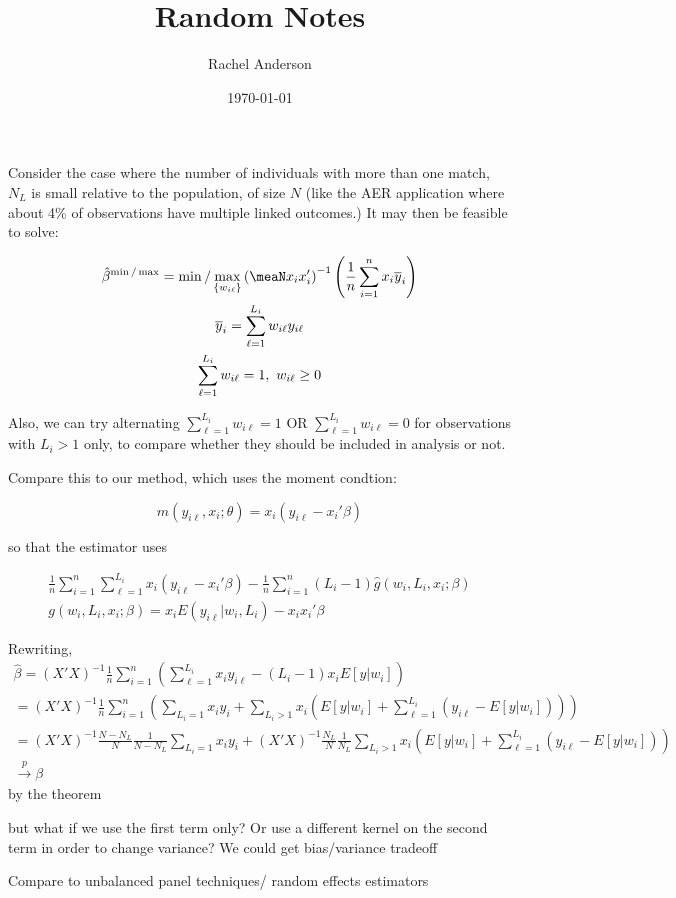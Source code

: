 \documentclass[11pt]{amsart}
\title{Random Notes}
\author{Rachel Anderson}
\date{\today}                                           %
\newcommand{\toP}{\overset{p}{\to}}
\newcommand{\meanN}{\frac{1}{n}\sum_{i=1}^n}
\newcommand{\sumL}{\sum_{\ell=1}^{L_i}}
\begin{document}
\maketitle

Consider the case where the number of individuals with more than one match, $N_{L}$ is small relative to the population, of size $N$ (like the AER application where about 4\% of observations have multiple linked outcomes.)  It may then be feasible to solve:

\begin{gather*}\hat{\beta}^{\min/\max} = \min/\max_{\{w_{i\ell}\}} \left(\meaN x_ix_i'\right)^{-1} \left(\meanN x_i \overline{y}_i \right) \\
\overline{y}_i = \sumL w_{i\ell} y_{i\ell} \\
\sumL w_{i\ell} = 1, \ w_{i\ell} \geq 0  \end{gather*}


Also, we can try alternating $\sumL w_{i\ell} = 1$ OR $\sumL w_{i\ell} = 0$ for observations with $L_i>1$ only, to compare whether they should be included in analysis or not.   


Compare this to our method, which uses the moment condtion:

$$m(y_{i\ell}, x_i; \theta) = x_i(y_{i\ell}-x_i'\beta)  $$ 

so that the estimator uses

\begin{gather*} \meanN \sumL   x_i(y_{i\ell}-x_i'\beta)   - \meanN (L_i-1) \hat{g}(w_i, L_i, x_i; \beta) \\
 g(w_i, L_i, x_i; \beta) = x_i E(y_{i\ell} | w_i, L_i) - x_ix_i'\beta
\end{gather*} 

Rewriting,
\begin{gather*} \hat{\beta} = (X'X)^{-1}\meanN \left( \sumL x_i y_{i\ell} - (L_i -1) x_i E[y | w_i]\right) \\
= (X'X)^{-1} \meanN \left( \sum_{L_i = 1} x_i y_i + \sum_{L_i > 1}  x_i \left(E[y | w_i] + \sumL (y_{i\ell} - E[y | w_i] ) \right)\right) \\
= (X'X)^{-1} \frac{N - N_L}{N} \frac{1}{N-N_L} \sum_{L_i = 1} x_i y_i + (X'X)^{-1} \frac{N_L}{N}\frac{1}{N_L} \sum_{L_i> 1} x_i \left(E[y|w_i] + \sum_{\ell=1}^{L_i}(y_{i\ell} - E[y  | w_i])\right)\\ 
\toP \beta
\end{gather*}
by the theorem


but what if we use the first term only?  Or use a different kernel on the second term in order to change variance?  We could get bias/variance tradeoff

Compare to unbalanced panel techniques/ random effects estimators 
\end{document}
